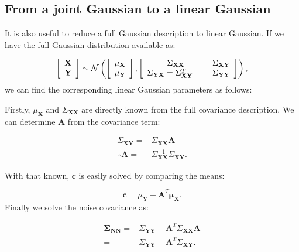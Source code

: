 \subsection{From a joint Gaussian to a linear Gaussian}

It is also useful to reduce a full Gaussian description to linear
Gaussian. If we have the full Gaussian distribution available as:

\[
\left[\begin{array}{c}
\mathbf{X}\\
\mathbf{Y}
\end{array}\right]\sim\mathcal{N}\left(\left[\begin{array}{c}
\mathbf{\mu_{\mathbf{X}}}\\
\mathbf{\mu_{\mathbf{Y}}}
\end{array}\right],\left[\begin{array}{cc}
\Sigma_{\mathbf{XX}} & \Sigma_{\mathbf{XY}}\\
\Sigma_{\mathbf{YX}}=\Sigma_{\mathbf{XY}}^{T}\hspace{5mm} & \Sigma_{\mathbf{YY}}
\end{array}\right]\right),
\]
 we can find the corresponding linear Gaussian parameters as follows:

Firstly, $\mu_{\mathbf{X}}$ and $\Sigma_{\mathbf{XX}}$ are directly
known from the full covariance description. We can determine $\mathbf{A}$
from the covariance term:

\begin{align}
\Sigma_{\mathbf{XY}}= & \Sigma_{\mathbf{XX}}\mathbf{A}\nonumber \\
\therefore\mathbf{A}= & \Sigma_{\mathbf{XX}}^{-1}\Sigma_{\mathbf{XY}}.
\end{align}


With that known, $\mathbf{c}$ is easily solved by comparing the means:

\begin{equation}
\mathbf{c}=\mu_{\mathbf{Y}}-\mathbf{A}^{T}\mathbf{\mu_{\mathbf{X}}}.
\end{equation}
Finally we solve the noise covariance as:

\begin{align}
\mathbf{\Sigma}_{\mathbf{NN}}= & \Sigma_{\mathbf{YY}}-\mathbf{A}^{T}\Sigma_{\mathbf{XX}}\mathbf{A}\nonumber \\
= & \Sigma_{\mathbf{YY}}-\mathbf{A}^{T}\Sigma_{\mathbf{XY}}.
\end{align}



